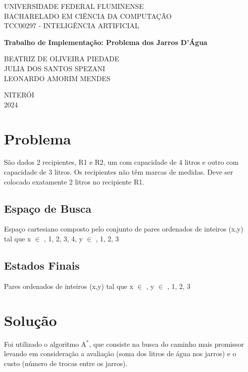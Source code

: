 \documentclass[12pt,a4paper]{article}
\begin{document}
	
\begin{titlepage}
	\centering
	\vspace{2cm}
	
	{UNIVERSIDADE FEDERAL FLUMINENSE} \\ [0.1cm]
	{BACHARELADO EM CIÊNCIA DA COMPUTAÇÃO} \\ [0.1cm]
	{TCC00297 - INTELIGÊNCIA ARTIFICIAL}
	
	\vfill
	
	{\Large \bfseries Trabalho de Implementação: Problema dos Jarros D'Água}
	
	\vfill
	
	{BEATRIZ DE OLIVEIRA PIEDADE} \\
	{JULIA DOS SANTOS SPEZANI} \\
	{LEONARDO AMORIM MENDES} 
	
	\vfill
	{NITERÓI} \\
	{2024}
\end{titlepage}

\tableofcontents

\newpage
\section{Problema}

São dados 2 recipientes, R1 e R2, um com capacidade de 4 litros e outro com capacidade de 3 litros. Os recipientes não têm marcas de medidas. Deve ser colocado exatamente 2 litros no recipiente R1.

\subsection{Espaço de Busca}
Espaço cartesiano composto pelo conjunto de pares ordenados de inteiros (x,y) tal que x $\in$ , 1, 2, 3, 4\textrquill, y $\in$ , 1, 2, 3\textrquill

\subsection{Estados Finais}
Pares ordenados de inteiros (x,y) tal que x $\in$ \textrquill, y $\in$ , 1, 2, 3\textrquill

\newpage
\section{Solução}

Foi utilizado o algoritmo A$^{*}$, que consiste na busca do caminho mais promissor levando em consideração a avaliação (soma dos litros de água nos jarros) e o custo (número de trocas entre os jarros).  
\end{document}
